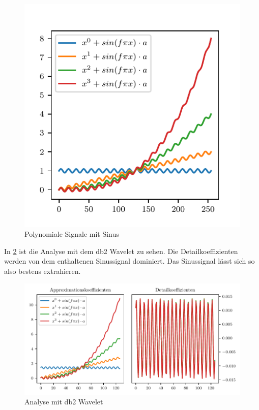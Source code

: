 \begin{refsection}
\begin{figure}
    \centering
    \includegraphics{papers/polynomials/images/polynomials_sin_signals.pdf}
    \caption{Polynomiale Signale mit Sinus\label{polynomials:sin:signals}}
\end{figure}

In \cref{polynomials:sin:db2} ist die Analyse mit dem db2 Wavelet zu sehen. Die
Detailkoeffizienten werden von dem enthaltenen Sinussignal dominiert. Das
Sinussignal lässt sich so also bestens extrahieren.

\begin{figure}
    \centering
    \includegraphics{papers/polynomials/images/polynomials_sin_db2.pdf}
    \caption{Analyse mit db2 Wavelet\label{polynomials:sin:db2}}
\end{figure}


\end{refsection}
